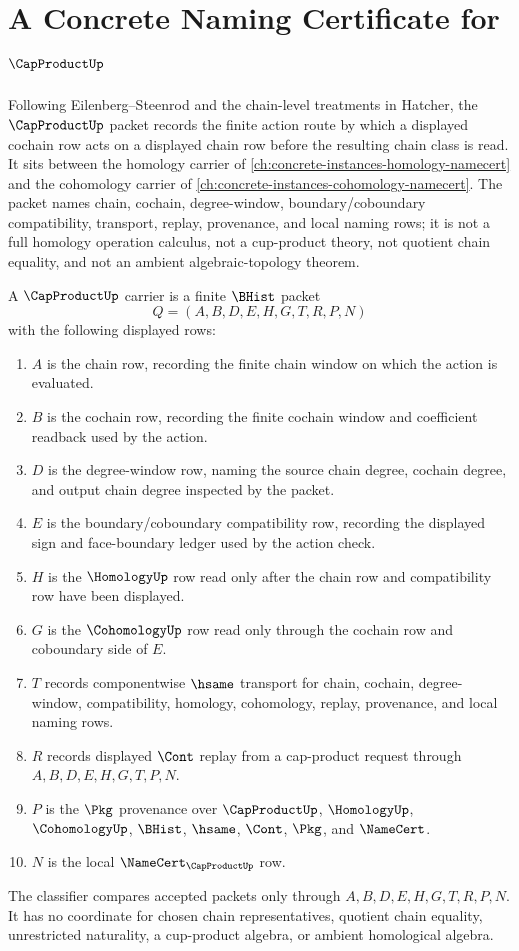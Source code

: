 \chapter{A Concrete Naming Certificate for $\CapProductUp$}
\label{ch:concrete-instances-cap-product-namecert}

Following Eilenberg--Steenrod and the chain-level treatments in Hatcher, the $\CapProductUp$ packet records the finite action route by which a displayed cochain row acts on a displayed chain row before the resulting chain class is read. It sits between the homology carrier of \autoref{ch:concrete-instances-homology-namecert} and the cohomology carrier of \autoref{ch:concrete-instances-cohomology-namecert}. The packet names chain, cochain, degree-window, boundary/coboundary compatibility, transport, replay, provenance, and local naming rows; it is not a full homology operation calculus, not a cup-product theory, not quotient chain equality, and not an ambient algebraic-topology theorem.

\begin{definition}\label{def:cap-product-carrier}
A $\CapProductUp$ carrier is a finite $\BHist$ packet
$$
Q=(A,B,D,E,H,G,T,R,P,N)
$$
with the following displayed rows:
\begin{enumerate}
\item $A$ is the chain row, recording the finite chain window on which the action is evaluated.
\item $B$ is the cochain row, recording the finite cochain window and coefficient readback used by the action.
\item $D$ is the degree-window row, naming the source chain degree, cochain degree, and output chain degree inspected by the packet.
\item $E$ is the boundary/coboundary compatibility row, recording the displayed sign and face-boundary ledger used by the action check.
\item $H$ is the $\HomologyUp$ row read only after the chain row and compatibility row have been displayed.
\item $G$ is the $\CohomologyUp$ row read only through the cochain row and coboundary side of $E$.
\item $T$ records componentwise $\hsame$ transport for chain, cochain, degree-window, compatibility, homology, cohomology, replay, provenance, and local naming rows.
\item $R$ records displayed $\Cont$ replay from a cap-product request through $A,B,D,E,H,G,T,P,N$.
\item $P$ is the $\Pkg$ provenance over $\CapProductUp$, $\HomologyUp$, $\CohomologyUp$, $\BHist$, $\hsame$, $\Cont$, $\Pkg$, and $\NameCert$.
\item $N$ is the local $\NameCert_{\CapProductUp}$ row.
\end{enumerate}
The classifier compares accepted packets only through $A,B,D,E,H,G,T,R,P,N$. It has no coordinate for chosen chain representatives, quotient chain equality, unrestricted naturality, a cup-product algebra, or ambient homological algebra.
\end{definition}

